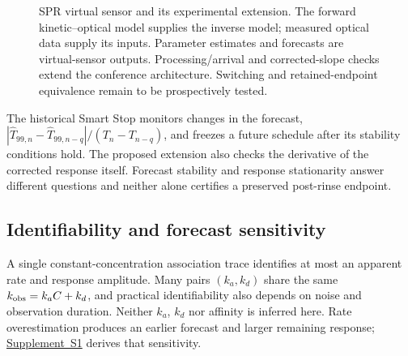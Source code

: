 \documentclass[lettersize,journal]{IEEEtran}
\newcommand{\supp}[1]{\href{SPR_smart_stop_supplement.pdf}{Supplement~#1}}
\begin{document}
\begin{figure}[t]\centering
{}
\caption{SPR virtual sensor and its experimental extension. The forward
kinetic--optical model supplies the inverse model; measured optical data
supply its inputs. Parameter estimates and forecasts are virtual-sensor
outputs. Processing/arrival and corrected-slope checks extend the
conference architecture. Switching and retained-endpoint equivalence
remain to be prospectively tested.}
\label{fig:virtual}
\end{figure}

The historical Smart Stop monitors changes in the forecast,
$|\widehat T_{99,n}-\widehat T_{99,n-q}|/(T_n-T_{n-q})$, and freezes a future
schedule after its stability conditions hold. The proposed extension also
checks the derivative of the corrected response itself. Forecast stability
and response stationarity answer different questions and neither alone
certifies a preserved post-rinse endpoint.

\subsection{Identifiability and forecast sensitivity}
A single constant-concentration association trace identifies at most an
apparent rate and response amplitude. Many pairs $(k_a,k_d)$ share the
same $k_{\rm obs}=k_aC+k_d$, and practical identifiability also depends on
noise and observation duration\cite{nguyen2023}. Neither $k_a$, $k_d$ nor
affinity is inferred here. Rate overestimation produces an earlier
forecast and larger remaining response; \supp{S1} derives that sensitivity.
\end{document}
